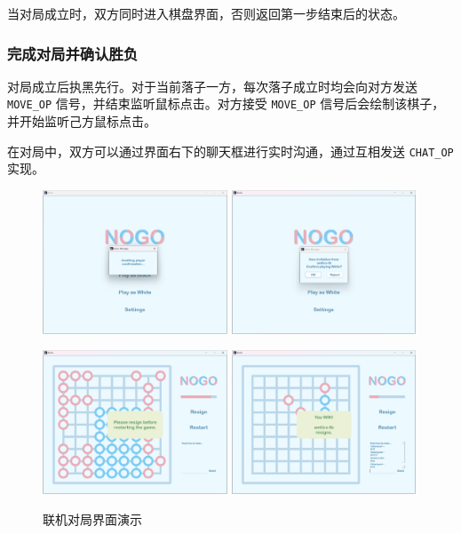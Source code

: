 \documentclass{noithesis}
\begin{document}
	当对局成立时，双方同时进入棋盘界面，否则返回第一步结束后的状态。 

    \subsubsection{完成对局并确认胜负}
    
    对局成立后执黑先行。对于当前落子一方，每次落子成立时均会向对方发送 \verb|MOVE_OP| 信号，并结束监听鼠标点击。对方接受 \verb|MOVE_OP| 信号后会绘制该棋子，并开始监听己方鼠标点击。
    
    在对局中，双方可以通过界面右下的聊天框进行实时沟通，通过互相发送 \verb|CHAT_OP| 实现。
    
   \begin{figure}[!htb]
    	\centering
    	
    	\includegraphics[width=5.5cm]{img/web4.png}
    	\includegraphics[width=5.5cm]{img/web5.png}
    	
    	\includegraphics[width=5.5cm]{img/web2.png}
    	\includegraphics[width=5.5cm]{img/web3.png}
    	
    	\caption{联机对局界面演示}
    \end{figure}
    
\end{document}
